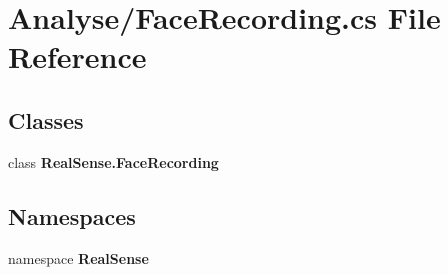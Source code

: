 \section{Analyse/\+Face\+Recording.cs File Reference}
\label{_face_recording_8cs}
\subsection*{Classes}
\begin{DoxyCompactItemize}
\item 
class \textbf{ Real\+Sense.\+Face\+Recording}
\end{DoxyCompactItemize}
\subsection*{Namespaces}
\begin{DoxyCompactItemize}
\item 
namespace \textbf{ Real\+Sense}
\end{DoxyCompactItemize}
